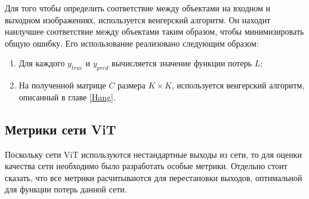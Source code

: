 \documentclass[14pt,a4paper]{extarticle}
\begin{document}
Для того чтобы определить соответствие между объектами на входном и выходном изображениях, используется венгерский алгоритм. Он находит наилучшее соответствие между объектами таким образом, чтобы минимизировать общую ошибку.
Его использование реализовано следующим образом:
\begin{enumerate}
\item Для каждого $y_{true}$ и $y_{pred}$ вычисляется значение функции потерь $L$;
\item На полученной матрице $C$ размера $K \times K$, используется венгерский алгоритм, описанный в главе \ref{Hang}.
\end{enumerate}

\newpage
\subsection{Метрики сети ViT} \label{ViT_metrics}
Поскольку сети ViT используются нестандартные выходы из сети, то для оценки качества сети необходимо было разработать особые метрики. Отдельно стоит сказать, что все метрики расчитываются для перестановки выходов, оптимальной для функции потерь данной сети.
\end{document}
